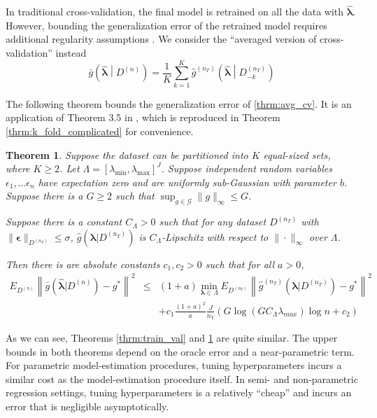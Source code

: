 \documentclass[12pt]{article}
\newtheorem{theorem}{Theorem}
\begin{document}
In traditional cross-validation, the final model is retrained on all the data with $\hat{\boldsymbol{\lambda}}$. However, bounding the generalization error of the retrained model requires additional regularity assumptions \citep{lecue2012oracle}. We consider the ``averaged version of cross-validation'' instead
\begin{equation}
\label{thrm:avg_cv}
\bar{g}\left ( \hat{\boldsymbol \lambda} \middle | {D^{(n)}} \right ) = 
\frac{1}{K} \sum_{k=1}^K 
\hat{g}^{(n_T)} \left (\hat{\boldsymbol \lambda} \middle | D^{(n_T)}_{-k} \right )
\end{equation}

The following theorem bounds the generalization error of \eqref{thrm:avg_cv}. It is an application of Theorem 3.5 in \citet{lecue2012oracle}, which is reproduced in Theorem \ref{thrm:k_fold_complicated} for convenience.

\begin{theorem}
\label{thrm:kfold}
Suppose the dataset can be partitioned into $K$ equal-sized sets, where $K \ge 2$. Let $\Lambda = [\lambda_{\min}, \lambda_{\max}]^J$. Suppose independent random variables $\epsilon_1, ... \epsilon_n$ have expectation zero and are uniformly sub-Gaussian with parameter $b$. 
Suppose there is a $G \ge  2$ such that $\sup_{g \in \mathcal{G}} \|g\|_\infty \le G$.

Suppose there is a constant $C_\Lambda >0$ such that for any dataset $D^{(n_T)}$ with $\|\boldsymbol{\epsilon}\|_{D^{(n_T)}} \le \sigma$, $\hat g (\boldsymbol{\lambda} | D^{(n_T)})$ is $C_\Lambda$-Lipschitz with respect to $\| \cdot \|_\infty$ over $\Lambda$.

Then there is are absolute constants $c_1, c_2 > 0$ such that for all $a > 0$,
\begin{eqnarray}
E_{D^{(n)}} \left \| \bar{g} ( \hat{\boldsymbol \lambda} | {D^{(n)}} ) - g^* \right \|^2 &\le&
(1+a) \min_{\boldsymbol{\lambda} \in \Lambda}  E_{D^{(n_T)}} \left \| \hat{g}^{(n_T)}(\boldsymbol \lambda | D^{(n_T)}) - g^* \right \|^2 \\
&& + c_1 \frac{(1+a)^2}{a} \frac{J}{n_V} 
\left (
G \log (GC_\Lambda \lambda_{max} ) \log n + c_2
\right )
\end{eqnarray}
\end{theorem}

As we can see, Theorems \ref{thrm:train_val} and \ref{thrm:kfold} are quite similar. The upper bounds in both theorems depend on the oracle error and a near-parametric term. For parametric model-estimation procedures, tuning hyperparameters incurs a similar cost as the model-estimation procedure itself. In semi- and non-parametric regression settings, tuning hyperparameters is a relatively ``cheap'' and incurs an error that is negligible asymptotically.
\end{document}
